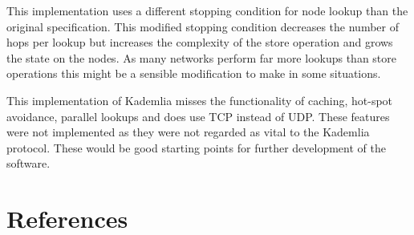 \documentclass[a4paper, 12pt]{article} %
\begin{document}

This implementation uses a different stopping condition for node lookup than the original specification. This modified stopping condition decreases the number of hops per lookup but increases the complexity of the store operation and grows the state on the nodes. As many networks perform far more lookups than store operations this might be a sensible modification to make in some situations. 


This implementation of Kademlia misses the functionality of caching, hot-spot avoidance, parallel lookups and does use TCP instead of UDP. These features were not implemented as they were not regarded as vital to the Kademlia protocol. These would be good starting points for further development of the software.


\newpage
\section{References}
\printbibliography[heading=none]
\end{document}
